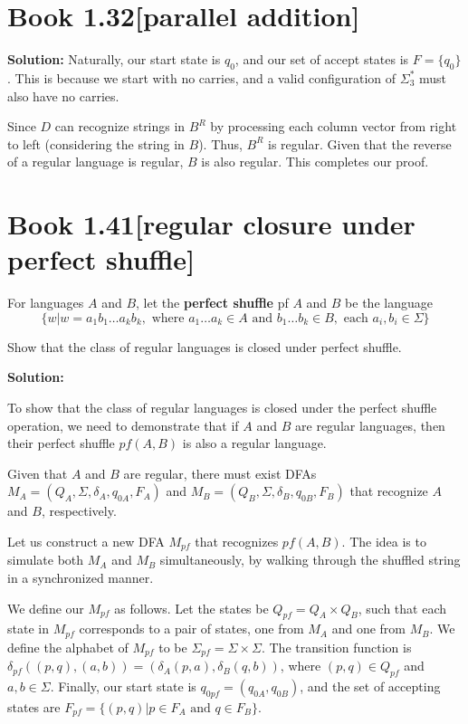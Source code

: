 \documentclass[11pt]{article}
\newenvironment{question}[2]
{\newpage\section{#1\texorpdfstring{\hfill}{horizontal spacing}{\rm\normalsize #2}}}{}
\newenvironment{solution}
{\textbf{Solution: }\color{blue}}
{\color{black}}
\begin{document}
\begin{question}{Book 1.32}{[parallel addition]}
\begin{solution}
Naturally, our start state is \(q_0\), and our set of accept states is \(F=\{q_0\}\). This is because we start with no carries, and a valid configuration of \(\Sigma_{3}^{*}\) must also have no carries.

Since \(D\) can recognize strings in \(B^{R}\) by processing each column vector from right to left (considering the string in \(B\)). Thus, \(B^{R}\) is regular. Given that the reverse of a regular language is regular, \(B\) is also regular. This completes our proof.

\end{solution}
\end{question}


\begin{question}{Book 1.41}{[regular closure under perfect shuffle]}
For languages \(A\) and \(B\), let the \textbf{perfect shuffle} pf \(A\) and \(B\) be the language
\[\{w | w = a_1 b_1 \ldots a_k b_k, \text{ where } a_1 \ldots a_k \in A \text{ and } b_1 \ldots b_k \in B, \text{ each } a_i,b_i \in \Sigma\}\]

Show that the class of regular languages is closed under perfect shuffle.

\begin{solution}

To show that the class of regular languages is closed under the perfect shuffle operation, we need to demonstrate that if \(A\) and \(B\) are regular languages, then their perfect shuffle \(pf(A,B)\) is also a regular language.

Given that \(A\) and \(B\) are regular, there must exist DFAs \(M_A = (Q_A, \Sigma, \delta_A, q_{0A}, F_A)\) and \(M_B = (Q_B, \Sigma, \delta_B, q_{0B}, F_B)\) that recognize \(A\) and \(B\), respectively.

Let us construct a new DFA \(M_{pf}\) that recognizes \(pf(A,B)\). The idea is to simulate both \(M_A\) and \(M_B\) simultaneously, by walking through the shuffled string in a synchronized manner.

We define our \(M_{pf}\) as follows. Let the states be \(Q_{pf} = Q_A \times Q_B\), such that each state in \(M_{pf}\) corresponds to a pair of states, one from \(M_A\) and one from \(M_B\). We define the alphabet of \(M_{pf}\) to be \(\Sigma_{pf} = \Sigma \times \Sigma\). The transition function is \(\delta_{pf}((p,q),(a,b)) = (\delta_A(p,a), \delta_B(q,b))\), where \((p,q) \in Q_{pf}\) and \(a,b \in \Sigma\). Finally, our start state is \(q_{0pf} = (q_{0A},q_{0B})\), and the set of accepting states are \(F_{pf} = \{(p,q) | p \in F_A \text{ and } q \in F_B\}\).


\end{solution}
\end{question}
\end{document}
